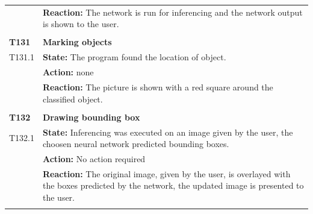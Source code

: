 \documentclass[parskip=full]{scrartcl}
\begin{document}
\begin{tabular}{p{2cm}p{12cm}}
& \textbf{Reaction:} The network is run for inferencing and the network output is shown to the user.\\
& \\
\textbf{T131} & \textbf{Marking objects}\\
T131.1 & \textbf{State:} The program found the location of object.\\
& \textbf{Action:} none \\
& \textbf{Reaction:} The picture is shown with a red square around the classified object.\\
& \\
\textbf{T132} & \textbf{Drawing bounding box}\\
T132.1 & \textbf{State:} Inferencing was executed on an image given by the user, the choosen neural network predicted bounding boxes.\\
& \textbf{Action:} No action required\\
& \textbf{Reaction:} The original image, given by the user, is overlayed with the boxes predicted by the network, the updated image is presented to the user.\\
& \\
\end{tabular}
\newpage
\end{document}
